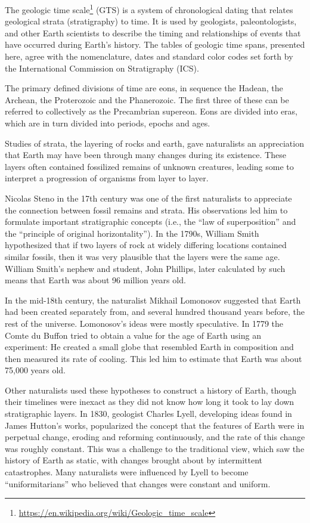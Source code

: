 \documentclass[]{book}
\let\rmarkdownfootnote\footnote%
\def\footnote{\protect\rmarkdownfootnote}
\renewcommand{\href}[2]{#2\footnote{\url{#1}}}
\theoremstyle{definition}
\theoremstyle{definition}
\theoremstyle{definition}
\theoremstyle{remark}
\begin{document}
\begin{enumerate}
The \href{https://en.wikipedia.org/wiki/Geologic_time_scale}{geologic
time scale} (GTS) is a system of chronological dating that relates
geological strata (stratigraphy) to time. It is used by geologists,
paleontologists, and other Earth scientists to describe the timing and
relationships of events that have occurred during Earth's history. The
tables of geologic time spans, presented here, agree with the
nomenclature, dates and standard color codes set forth by the
International Commission on Stratigraphy (ICS).

The primary defined divisions of time are eons, in sequence the Hadean,
the Archean, the Proterozoic and the Phanerozoic. The first three of
these can be referred to collectively as the Precambrian supereon. Eons
are divided into eras, which are in turn divided into periods, epochs
and ages.

Studies of strata, the layering of rocks and earth, gave naturalists an
appreciation that Earth may have been through many changes during its
existence. These layers often contained fossilized remains of unknown
creatures, leading some to interpret a progression of organisms from
layer to layer.

Nicolas Steno in the 17th century was one of the first naturalists to
appreciate the connection between fossil remains and strata. His
observations led him to formulate important stratigraphic concepts
(i.e., the ``law of superposition'' and the ``principle of original
horizontality''). In the 1790s, William Smith hypothesized that if two
layers of rock at widely differing locations contained similar fossils,
then it was very plausible that the layers were the same age. William
Smith's nephew and student, John Phillips, later calculated by such
means that Earth was about 96 million years old.

In the mid-18th century, the naturalist Mikhail Lomonosov suggested that
Earth had been created separately from, and several hundred thousand
years before, the rest of the universe. Lomonosov's ideas were mostly
speculative. In 1779 the Comte du Buffon tried to obtain a value for the
age of Earth using an experiment: He created a small globe that
resembled Earth in composition and then measured its rate of cooling.
This led him to estimate that Earth was about 75,000 years old.

Other naturalists used these hypotheses to construct a history of Earth,
though their timelines were inexact as they did not know how long it
took to lay down stratigraphic layers. In 1830, geologist Charles Lyell,
developing ideas found in James Hutton's works, popularized the concept
that the features of Earth were in perpetual change, eroding and
reforming continuously, and the rate of this change was roughly
constant. This was a challenge to the traditional view, which saw the
history of Earth as static, with changes brought about by intermittent
catastrophes. Many naturalists were influenced by Lyell to become
``uniformitarians'' who believed that changes were constant and uniform.


\end{enumerate}
\end{document}
